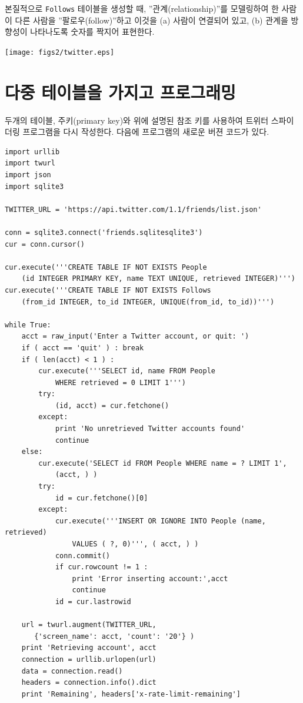 본질적으로 {\tt Follows} 테이블을 생성할 때, ''관계(relationship)''를 모델링하여 한 사람이 다른 사람을 ''팔로우(follow)''하고
이것을 (a) 사람이 연결되어 있고, (b) 관계을 방향성이 나타나도록 숫자를 짝지어 표현한다.  

\beforefig
\centerline{\texttt{[image: figs2/twitter.eps]}}
\afterfig

\section{다중 테이블을 가지고 프로그래밍}
두개의 테이블, 주키(primary key)와 위에 설명된 참조 키를 사용하여 트위터 스파이더링 프로그램을 다시 작성한다.
다음에 프로그램의 새로운 버젼 코드가 있다.

\beforeverb
\begin{verbatim}
import urllib
import twurl
import json
import sqlite3

TWITTER_URL = 'https://api.twitter.com/1.1/friends/list.json'

conn = sqlite3.connect('friends.sqlitesqlite3')
cur = conn.cursor()

cur.execute('''CREATE TABLE IF NOT EXISTS People 
    (id INTEGER PRIMARY KEY, name TEXT UNIQUE, retrieved INTEGER)''')
cur.execute('''CREATE TABLE IF NOT EXISTS Follows 
    (from_id INTEGER, to_id INTEGER, UNIQUE(from_id, to_id))''')

while True:
    acct = raw_input('Enter a Twitter account, or quit: ')
    if ( acct == 'quit' ) : break
    if ( len(acct) < 1 ) :
        cur.execute('''SELECT id, name FROM People 
            WHERE retrieved = 0 LIMIT 1''')
        try:
            (id, acct) = cur.fetchone()
        except:
            print 'No unretrieved Twitter accounts found'
            continue
    else:
        cur.execute('SELECT id FROM People WHERE name = ? LIMIT 1', 
            (acct, ) )
        try:
            id = cur.fetchone()[0]
        except:
            cur.execute('''INSERT OR IGNORE INTO People (name, retrieved) 
                VALUES ( ?, 0)''', ( acct, ) )
            conn.commit()
            if cur.rowcount != 1 : 
                print 'Error inserting account:',acct
                continue
            id = cur.lastrowid

    url = twurl.augment(TWITTER_URL, 
       {'screen_name': acct, 'count': '20'} )
    print 'Retrieving account', acct
    connection = urllib.urlopen(url)
    data = connection.read()
    headers = connection.info().dict
    print 'Remaining', headers['x-rate-limit-remaining']


\end{verbatim}
